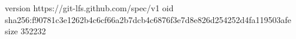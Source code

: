 version https://git-lfs.github.com/spec/v1
oid sha256:f90781c3e1262b4c6cf66a2b7dcb4c6876f3e7d8e826d254252d4fa119503afe
size 352232
